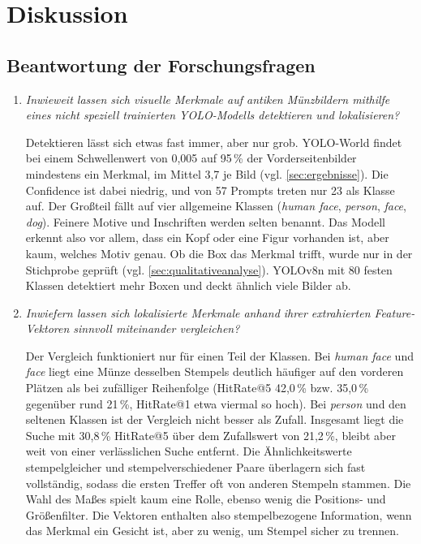 
\chapter{Diskussion}\label{ch:discussion} %
\glsresetall %

\section{Beantwortung der Forschungsfragen}
\label{sec:beantwortungfragen}
\begin{enumerate}
    \item \textit{Inwieweit lassen sich visuelle Merkmale auf antiken Münzbildern mithilfe eines nicht speziell trainierten YOLO-Modells detektieren und lokalisieren?}
 
    \noindent Detektieren lässt sich etwas fast immer, aber nur grob. YOLO-World findet bei einem Schwellenwert von 0,005 auf 95\,\% der Vorderseitenbilder mindestens ein Merkmal, im Mittel 3,7 je Bild (vgl. \cref{sec:ergebnisse}). Die Confidence ist dabei niedrig, und von 57 Prompts treten nur 23 als Klasse auf. Der Großteil fällt auf vier allgemeine Klassen (\textit{human face}, \textit{person}, \textit{face}, \textit{dog}). Feinere Motive und Inschriften werden selten benannt. Das Modell erkennt also vor allem, dass ein Kopf oder eine Figur vorhanden ist, aber kaum, welches Motiv genau. Ob die Box das Merkmal trifft, wurde nur in der Stichprobe geprüft (vgl. \cref{sec:qualitativeanalyse}). YOLOv8n mit 80 festen Klassen detektiert mehr Boxen und deckt ähnlich viele Bilder ab.
 
    \item \textit{Inwiefern lassen sich lokalisierte Merkmale anhand ihrer extrahierten Feature-Vektoren sinnvoll miteinander vergleichen?}
 
    \noindent Der Vergleich funktioniert nur für einen Teil der Klassen. Bei \textit{human face} und \textit{face} liegt eine Münze desselben Stempels deutlich häufiger auf den vorderen Plätzen als bei zufälliger Reihenfolge (HitRate@5 42,0\,\% bzw. 35,0\,\% gegenüber rund 21\,\%, HitRate@1 etwa viermal so hoch). Bei \textit{person} und den seltenen Klassen ist der Vergleich nicht besser als Zufall. Insgesamt liegt die Suche mit 30,8\,\% HitRate@5 über dem Zufallswert von 21,2\,\%, bleibt aber weit von einer verlässlichen Suche entfernt. Die Ähnlichkeitswerte stempelgleicher und stempelverschiedener Paare überlagern sich fast vollständig, sodass die ersten Treffer oft von anderen Stempeln stammen. Die Wahl des Maßes spielt kaum eine Rolle, ebenso wenig die Positions- und Größenfilter. Die Vektoren enthalten also stempelbezogene Information, wenn das Merkmal ein Gesicht ist, aber zu wenig, um Stempel sicher zu trennen.
 

\end{enumerate}
